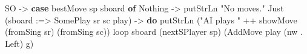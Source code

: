 \documentclass[]{article}
\newenvironment{Shaded}{}{}
\newcommand{\DataTypeTok}[1]{\textcolor[rgb]{0.56,0.13,0.00}{#1}}
\newcommand{\FunctionTok}[1]{\textcolor[rgb]{0.02,0.16,0.49}{#1}}
\newcommand{\KeywordTok}[1]{\textcolor[rgb]{0.00,0.44,0.13}{\textbf{#1}}}
\newcommand{\NormalTok}[1]{#1}
\newcommand{\OperatorTok}[1]{\textcolor[rgb]{0.40,0.40,0.40}{#1}}
\newcommand{\OtherTok}[1]{\textcolor[rgb]{0.00,0.44,0.13}{#1}}
\newcommand{\StringTok}[1]{\textcolor[rgb]{0.25,0.44,0.63}{#1}}
\begin{document}
\begin{Shaded}
\begin{Highlighting}[]
                \DataTypeTok{SO} \OtherTok{{-}\textgreater{}}
                    \KeywordTok{case}\NormalTok{ bestMove sp sboard }\KeywordTok{of}
                        \DataTypeTok{Nothing} \OtherTok{{-}\textgreater{}} \FunctionTok{putStrLn} \StringTok{"No moves."}
                        \DataTypeTok{Just}\NormalTok{ (sboard\textquotesingle{} }\OperatorTok{:=\textgreater{}} \DataTypeTok{SomePlay}\NormalTok{ sr sc play) }\OtherTok{{-}\textgreater{}} \KeywordTok{do}
                            \FunctionTok{putStrLn}\NormalTok{ (}\StringTok{"AI plays "} \OperatorTok{++}\NormalTok{ showMove (fromSing sr) (fromSing sc))}
\NormalTok{                            loop sboard\textquotesingle{} (nextSPlayer sp) (}\DataTypeTok{AddMove}\NormalTok{ play (nw }\OperatorTok{.} \DataTypeTok{Left}\NormalTok{) g)}
\end{Highlighting}
\end{Shaded}
\end{document}
